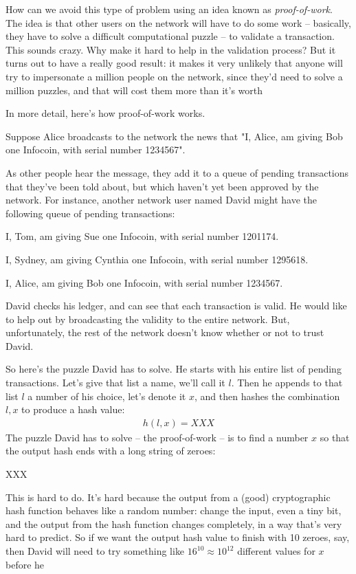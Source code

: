 \documentclass[12pt]{book}
\newcounter{problem}[chapter]
\begin{document}
How can we avoid this type of problem using an idea known as
\emph{proof-of-work}.  The idea is that other users on the network
will have to do some work -- basically, they have to solve a difficult
computational puzzle -- to validate a transaction.  This sounds crazy.
Why make it hard to help in the validation process?  But it turns out
to have a really good result: it makes it very unlikely that anyone
will try to impersonate a million people on the network, since they'd
need to solve a million puzzles, and that will cost them more than
it's worth

In more detail, here's how proof-of-work works.

Suppose Alice broadcasts to the network the news that "I, Alice, am
giving Bob one Infocoin, with serial number 1234567".  

As other people hear the message, they add it to a queue of pending
transactions that they've been told about, but which haven't yet been
approved by the network.  For instance, another network user named
David might have the following queue of pending transactions:

I, Tom, am giving Sue one Infocoin, with serial number 1201174.

I, Sydney, am giving Cynthia one Infocoin, with serial number 1295618.

I, Alice, am giving Bob one Infocoin, with serial number 1234567.

David checks his ledger, and can see that each transaction is valid.
He would like to help out by broadcasting the validity to the entire
network.  But, unfortunately, the rest of the network doesn't know
whether or not to trust David.

So here's the puzzle David has to solve.  He starts with his entire
list of pending transactions.  Let's give that list a name, we'll call
it $l$.  Then he appends to that list $l$ a number of his choice,
let's denote it $x$, and then hashes the combination $l, x$ to produce
a hash value:
\begin{eqnarray}
h(l, x) = XXX
\end{eqnarray}
The puzzle David has to solve -- the proof-of-work -- is to find a
number $x$ so that the output hash ends with a long string of zeroes:

XXX

This is hard to do.  It's hard because the output from a (good)
cryptographic hash function behaves like a random number: change the
input, even a tiny bit, and the output from the hash function changes
completely, in a way that's very hard to predict.  So if we want the
output hash value to finish with 10 zeroes, say, then David will
need to try something like $16^{10} \approx 10^{12}$ different values
for $x$ before he 
\end{document}
